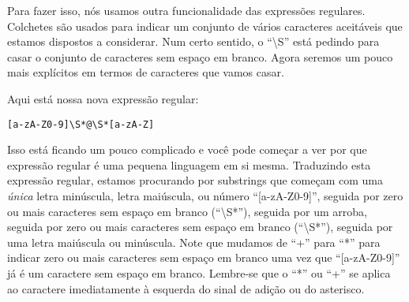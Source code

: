 Para fazer isso, nós usamos outra funcionalidade das expressões regulares. Colchetes são usados para
indicar um conjunto de vários caracteres aceitáveis que estamos dispostos a considerar. Num certo 
sentido, o ``{\textbackslash}S'' está pedindo para casar o conjunto de caracteres sem espaço em branco.
Agora seremos um pouco mais explícitos em termos de caracteres que vamos casar.

Aqui está nossa nova expressão regular:

\beforeverb
\begin{verbatim}
[a-zA-Z0-9]\S*@\S*[a-zA-Z]
\end{verbatim}
\afterverb
%

Isso está ficando um pouco complicado e você pode começar a ver por que expressão regular é uma 
pequena linguagem em si mesma. Traduzindo esta expressão regular, estamos procurando por substrings 
que começam com uma {\em única} letra minúscula, letra maiúscula, ou número ``[a-zA-Z0-9]'', seguida 
por zero ou mais caracteres sem espaço em branco (``{\textbackslash}S*''), seguida por um arroba, seguida 
por zero ou mais caracteres sem espaço em branco (``{\textbackslash}S*''), seguida por uma letra maiúscula 
ou minúscula. Note que mudamos de ``+'' para ``*'' para indicar zero ou mais caracteres sem espaço em branco 
uma vez que ``[a-zA-Z0-9]'' já é um caractere sem espaço em branco. Lembre-se que o ``*'' ou ``+'' se aplica 
ao caractere imediatamente à esquerda do sinal de adição ou do asterisco.

